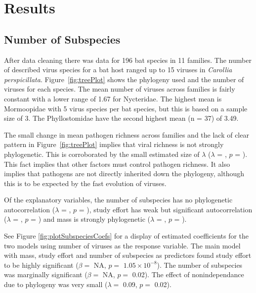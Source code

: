 
\clearpage
\section{Results}


\subsection{Number of Subspecies}

After data cleaning there was data for 196 bat species in 11 families.
The number of described virus species for a bat host ranged up to 15 viruses in \emph{Carollia perspicillata}.
Figure~\ref{fig:treePlot} shows the phylogeny used and the number of viruses for each species.
The mean number of viruses across families is fairly constant with a lower range of 1.67 for Nycteridae.
The highest mean is Mormoopidae with 5 virus species per bat species, but this is based on a sample size of 3.
The Phyllostomidae have the second highest mean (n = 37) of 3.49.

The small change in mean pathogen richness across families and the lack of clear pattern in Figure~\ref{fig:treePlot} implies that viral richness is not strongly phylogenetic. 
This is corroborated by the small estimated size of $\lambda$ ($\lambda$ = , $p$ = ).
This fact implies that other factors must control pathogen richness.
It also implies that pathogens are not directly inherited down the phylogeny, although this is to be expected by the fast evolution of viruses.

Of the explanatory variables, the number of subspecies has no phylogenetic autocorrelation ($\lambda$ = , $p$ = ), study effort has weak but significant autocorrelation ($\lambda$ = , $p$ = ) and mass is strongly phylogenetic ($\lambda$ = , $p$ = ).

See Figure \ref{fig:plotSubspeciesCoefs} for a display of estimated coefficients for the two models using number of viruses as the response variable. 
The main model with mass, study effort and number of subspecies as predictors found study effort to be highly significant ($\beta = $ NA, $p = $ \ensuremath{1.05\times 10^{-8}}). 
The number of subspecies was marginally significant ($\beta = $ NA, $p = $ 0.02). 
The effect of nonindependance due to phylogeny was very small ($\lambda = $ 0.09, $p = $ 0.02).


